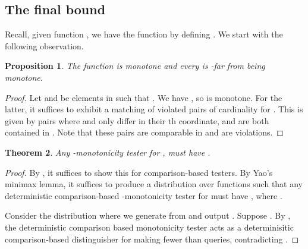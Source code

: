 \documentclass[11pt]{article}
\newtheorem{theorem}{Theorem}[section]
\newtheorem{proposition}[theorem]{Proposition}
\begin{document}
\subsection{The final bound}
\def\v{{\tt val}}

Recall, given  function , we have 
the function  by defining .
We start with the following observation.

\begin{proposition}\label{prop:dist}
The function  is monotone and
every  is -far from being monotone.
\end{proposition}

\begin{proof} Let  and  be elements in  such that .
We have , so  is monotone.
For the latter, it suffices to exhibit a matching of violated pairs of cardinality  for . This is 
given by pairs  where  and  only differ in their
th coordinate, and are both contained in . Note that these pairs are comparable in 
and are violations.
\end{proof}


\begin{theorem}\label{thm:hc}
Any -monotonicity tester for , must have .
\end{theorem}

\begin{proof} By , it suffices to show this for comparison-based  testers.
By Yao's minimax lemma, it suffices to produce a distribution  over functions  such
that any deterministic comparison-based -monotonicity tester for  must have ,
where .

Consider the distribution  where we generate  from  and output . 
Suppose . By , the deterministic comparison based monotonicity tester acts as a determinisitic comparison-based distinguisher
for 
making fewer than  queries, contradicting .
\end{proof}
\end{document}
